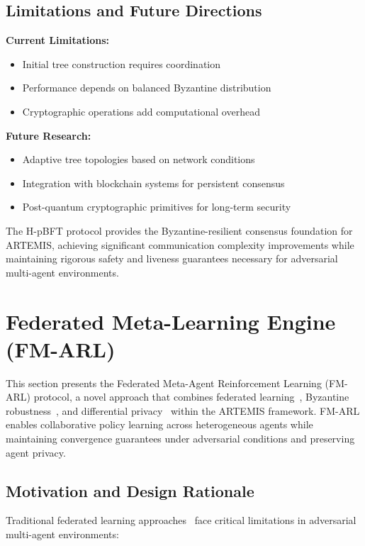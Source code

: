 \documentclass[conference]{IEEEtran}
\begin{document}
\subsection{Limitations and Future Directions}

\textbf{Current Limitations:}
\begin{itemize}
    \item Initial tree construction requires coordination
    \item Performance depends on balanced Byzantine distribution
    \item Cryptographic operations add computational overhead
\end{itemize}

\textbf{Future Research:}
\begin{itemize}
    \item Adaptive tree topologies based on network conditions
    \item Integration with blockchain systems for persistent consensus
    \item Post-quantum cryptographic primitives for long-term security
\end{itemize}

The H-pBFT protocol provides the Byzantine-resilient consensus foundation for ARTEMIS, achieving significant communication complexity improvements while maintaining rigorous safety and liveness guarantees necessary for adversarial multi-agent environments.

\section{Federated Meta-Learning Engine (FM-ARL)}

This section presents the Federated Meta-Agent Reinforcement Learning (FM-ARL) protocol, a novel approach that combines federated learning~\cite{mcmahan2017federated}, Byzantine robustness~\cite{blanchard2017machine}, and differential privacy~\cite{dwork2006calibrating} within the ARTEMIS framework. FM-ARL enables collaborative policy learning across heterogeneous agents while maintaining convergence guarantees under adversarial conditions and preserving agent privacy.

\subsection{Motivation and Design Rationale}

Traditional federated learning approaches~\cite{mcmahan2017federated,li2020federated} face critical limitations in adversarial multi-agent environments:
\end{document}
